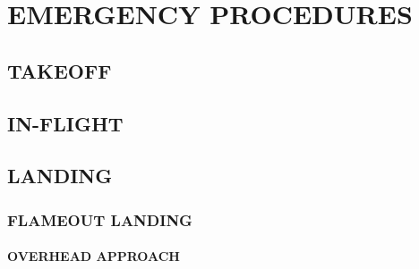 \chapter[EMERGENCY]{EMERGENCY PROCEDURES}
\localtableofcontents
\thispagestyle{plain}
\cleardoublepage

\marginfigeometry

\section{TAKEOFF}

\section{IN-FLIGHT}

\clearpage

\section{LANDING}

\marginfigrestore

\subsection{FLAMEOUT LANDING}

\subsubsection{OVERHEAD APPROACH}

